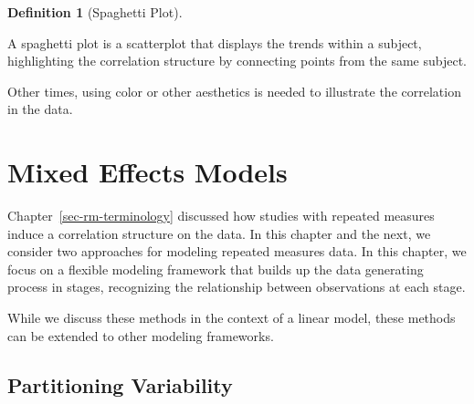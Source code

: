 \documentclass[
  letterpaper,
  DIV=11,
  numbers=noendperiod]{scrreprt}
\theoremstyle{definition}
\theoremstyle{definition}
\newtheorem{definition}{Definition}[chapter]
\theoremstyle{remark}
\begin{document}
\begin{definition}[Spaghetti
Plot]\protect\hypertarget{def-spaghetti-plot}{}\label{def-spaghetti-plot}

A spaghetti plot is a scatterplot that displays the trends within a
subject, highlighting the correlation structure by connecting points
from the same subject.

\end{definition}

Other times, using color or other aesthetics is needed to illustrate the
correlation in the data.

\hypertarget{sec-rm-mixed-models}{%
\chapter{Mixed Effects Models}\label{sec-rm-mixed-models}}

\providecommand{\norm}[1]{\lVert#1\rVert}
\providecommand{\abs}[1]{\lvert#1\rvert}
\providecommand{\dist}[1]{\stackrel{\text{#1}}{\sim}}
\providecommand{\ind}[1]{\mathbb{I}\left(#1\right)}
\providecommand{\bm}[1]{\mathbf{#1}}
\providecommand{\bs}[1]{\boldsymbol{#1}}
\providecommand{\Ell}{\mathcal{L}}
\providecommand{\indep}{\perp\negthickspace\negmedspace\perp}

Chapter~\ref{sec-rm-terminology} discussed how studies with repeated
measures induce a correlation structure on the data. In this chapter and
the next, we consider two approaches for modeling repeated measures
data. In this chapter, we focus on a flexible modeling framework that
builds up the data generating process in stages, recognizing the
relationship between observations at each stage.

\begin{tcolorbox}[enhanced jigsaw, bottomrule=.15mm, titlerule=0mm, bottomtitle=1mm, colback=white, coltitle=black, rightrule=.15mm, leftrule=.75mm, toprule=.15mm, toptitle=1mm, left=2mm, opacityback=0, colframe=quarto-callout-note-color-frame, breakable, title=\textcolor{quarto-callout-note-color}{\faInfo}\hspace{0.5em}{Note}, arc=.35mm, colbacktitle=quarto-callout-note-color!10!white, opacitybacktitle=0.6]

While we discuss these methods in the context of a linear model, these
methods can be extended to other modeling frameworks.

\end{tcolorbox}

\hypertarget{partitioning-variability}{%
\section{Partitioning Variability}\label{partitioning-variability}}
\end{document}
